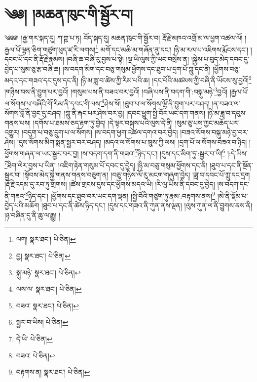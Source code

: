 \setcounter{footnote}{0} 
\chapter{༄༅། །མཆན་ཁུང་གི་སྦྱོར་བ།}༄༅༅། །རྒྱ་གར་སྐད་དུ། ཀ་ཀྵ་པ་ཏ། བོད་སྐད་དུ། མཆན་ཁུང་གི་སྦྱོར་བ། རྡོ་རྗེ་མཁའ་འགྲོ་མ་ལ་ཕྱག་འཚལ་ལོ། །རྒྱལ་པོ་ལྷན་ཅིག་གཙུག་ཕུད་ཛ་རི་ལགས།\footnote{ལག།  སྣར་ཐང་།  པེ་ཅིན། } མགོ་དང་མཆི་མ་གཞོན་ནུ་དང་། །ཉི་མ་རལ་པ་འཇིགས་རྨོངས་དང་། །དབང་པོ་དང་ནི་རྡོ་རྗེ་རྣམས། །བཞི་ཆ་བཞི་རུ་བྱས་པ་སྟེ། །ལྔ་ཡི་ལུས་ཀྱི་ཡང་བསྲེས་ན། །སྐྱེས་པ་བུད་མེད་དབང་དུ་བྱེད་པ་སུམ་ཅུ་རྩ་བཞི་ཆ། །ས་བདག་མིག་དང་བཅུ་གསུམ་ཕྱོགས་དང་ཐུབ་པ་དྲག་པོ་ཀླུ་དང་ནི། །ཕྱོགས་བཅུ་མདའ་དང་གཟའ་དང་དུས་དང་ནི། །ཉི་མ་ཟླ་བ་ཚེས་ཀྱི་རིམ་པའི་ཆ། །དང་པོའི་མཚམས་ཀྱི་བཞི་ནི་ཡོངས་སུ་བྱའོ།\footnote{བྱ།  སྣར་ཐང་།  པེ་ཅིན། } །གཉིས་བས་ནི་བྱུག་པར་བྱའོ། །གསུམ་པས་ནི་བཟའ་བར་བྱའོ། །བཞི་པས་ནི་བདག་གི་:བསྐུ་མཉེ་\footnote{སྐུ་མཉེ་  སྣར་ཐང་།  པེ་ཅིན། }བྱའོ། །རྒྱལ་པོ་ལ་སོགས་པ་བཞིའི་གོ་རིམ་ནི་དབང་གི་ལས་\footnote{ལས་ལ་  སྣར་ཐང་།  པེ་ཅིན། }ཤེས་སོ། །ཐུབ་པ་ལ་སོགས་ལྷོ་ནི་བྱུག་པར་བཤད། །ན་བཟའ་ལ་སོགས་བློ་ནི་བྱང་དུ་བཤད། །ཀླུ་ནི་རྐང་པར་ཤེས་བར་བྱ། །དབང་ཕྱུག་སྤྱི་བོར་ཡང་དག་གནས། །ཉི་མ་ཟླ་བ་དབུས་གནས་པས། །དགོས་པ་ཐམས་ཅད་རྟག་ཏུ་བྱེད། །དེ་ལྟར་བསྐུས་པའི་ལུས་དེ་ནི། །སུམ་ཅུ་པས་ཀྱང་མཆོད་པར་འགྱུར། །བདུག་པ་བཅུ་དྲུག་པ་ལ་སོགས། །ས་བདག་ཕྱག་འཚལ་དགའ་བར་བྱེད། །བཟའ་སོགས་བསྐུ་མཉེ་བྱ་བར་ཤེས། །དུས་སོགས་མིག་སྨན་སྦྱར་བར་བཤད། །མདའ་ལ་སོགས་པ་ཁྲུས་ཀྱི་ལས། །དྲག་པོ་ལ་སོགས་བཟའ་བ་ཉིད། །ཕྱོགས་གཞན་ལ་ཡང་སྦྱར་བར་བྱ། །ས་བདག་དག་ནི་གཟའ་\footnote{བཟའ་  སྣར་ཐང་།  པེ་ཅིན། }ཉིད་དང་། །དུས་དང་མིག་ཏུ་:སྦྱར་བ་ཡི།\footnote{སྦྱར་བ་ཡིས།  པེ་ཅིན། } །:དེ་ཡིས་\footnote{དེ་ཡི་  པེ་ཅིན། }ཐིག་ལེར་བྱས་པ་ཡིན། །འཇིག་རྟེན་གསུམ་པོ་དབང་དུ་བྱེད། །ཉི་མ་བཅུ་གསུམ་ཕྱོགས་དང་ནི། །ཐུབ་པ་དང་ནི་སྔོན་སྦྱར་བ། །སྟོབས་མེད་སྐྱེ་གནས་གནས་བཅུག་ན། །བཅུ་གཉིས་ལོ་རུ་མངག་གཞུག་བྱེད། །ཟླ་བ་དབང་པོ་ཀླུ་དང་དྲག །རྡོ་རྗེ་འདམ་དུ་རབ་ཏུ་གྲགས། །ཚེས་གྲངས་དུས་དང་ཕྱོགས་མདའ་ཡི། །རི་ལུ་ཡིས་ནི་དབང་དུ་བྱེད། །ས་བདག་དང་ནི་གཟའ་\footnote{བཟའ་  པེ་ཅིན། }ཉིད་དང་། །ཕྱོགས་དང་ཐུབ་བར་ཡང་དག་ལྡན། །སྤྱི་བོའི་གཙུག་ཏུ་རྣམ་:བརྟགས་ནས།\footnote{བརྟགས་ན།  སྣར་ཐང་།  པེ་ཅིན། } །མེ་ནི་སྡོམ་པ་བྱེད་པའི་མཆོག །ཐུབ་པ་དང་ནི་ཚེས་ཉིད་དང་། །དུས་དང་གཟའ་ནི་ཀུན་ནས་ལྡན། །ལུས་ཀུན་ལ་ནི་བྱུགས་ནས་ནི། །ཉ་བཞིན་དུ་ནི་ཆུ་ལ་རྒྱུ། །
